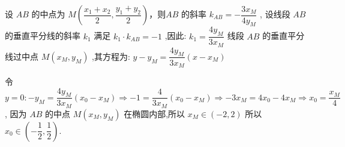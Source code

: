 \begin{enumerate}
\begin{jieda}
        设 ${AB}$ 的中点为 $M\left( {\dfrac{{x}_{1} + {x}_{2}}{2},\dfrac{{y}_{1} + {y}_{2}}{2}}\right)$，则${AB}$ 的斜率 ${k}_{AB} =  - \dfrac{3{x}_{M}}{4{y}_{M}}$ ,
        设线段 ${AB}$ 的垂直平分线的斜率 ${k}_{1}$ 满足 ${k}_{1} \cdot  {k}_{AB} =  - 1$ ,因此: ${k}_{1} = \dfrac{4{y}_{M}}{3{x}_{M}}$
        线段 ${AB}$ 的垂直平分线过中点 $M\left( {{x}_{M},{y}_{M}}\right)$ ,其方程为: $y - {y}_{M} = \dfrac{4{y}_{M}}{3{x}_{M}}\left( {x - {x}_{M}}\right)$
        
        令 $y = 0 :  - {y}_{M} = \dfrac{4{y}_{M}}{3{x}_{M}}\left( {{x}_{0} - {x}_{M}}\right)  \Longrightarrow   - 1 = \dfrac{4}{3{x}_{M}}\left( {{x}_{0} - {x}_{M}}\right)  \Longrightarrow   - 3{x}_{M} = 4{x}_{0} - 4{x}_{M} \Longrightarrow  {x}_{0} = \dfrac{{x}_{M}}{4}$ ,
        因为 ${AB}$ 的中点 $M\left( {{x}_{M},{y}_{M}}\right)$ 在椭圆内部,所以 ${x}_{M} \in  \left( {-2,2}\right)$
        所以 ${x}_{0} \in  \left( {-\dfrac{1}{2},\dfrac{1}{2}}\right)$.
    \end{jieda}
\end{enumerate}

